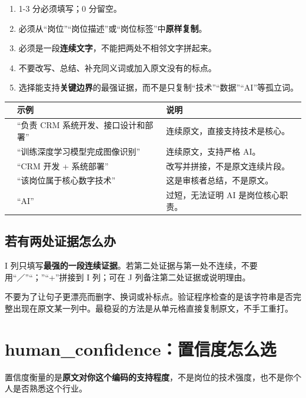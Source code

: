 \documentclass[11pt,a4paper,fontset=none]{ctexart}
\newcommand{\yes}{\textcolor{green}{\ding{51}}}
\newcommand{\no}{\textcolor{red!70!black}{\ding{55}}}
\begin{document}
\begin{enumerate}
  \item 1-3 分必须填写；0 分留空。
  \item 必须从“岗位”“岗位描述”或“岗位标签”中\textbf{原样复制}。
  \item 必须是一段\textbf{连续文字}，不能把两处不相邻文字拼起来。
  \item 不要改写、总结、补充同义词或加入原文没有的标点。
  \item 选择能支持\textbf{关键边界}的最强证据，而不是只复制“技术”“数据”“AI”等孤立词。
\end{enumerate}

\begin{center}
\noindent\begin{tabularx}{\textwidth}{C{1.1cm}Y Y}
\toprule
 & 示例 & 说明\\
\midrule
\yes & “负责 CRM 系统开发、接口设计和部署” & 连续原文，直接支持技术是核心。\\
\yes & “训练深度学习模型完成图像识别” & 连续原文，支持严格 AI。\\
\no & “CRM 开发 + 系统部署” & 改写并拼接，不是原文连续片段。\\
\no & “该岗位属于核心数字技术” & 这是审核者总结，不是原文。\\
\no & “AI” & 过短，无法证明 AI 是岗位核心职责。\\
\bottomrule
\end{tabularx}
\end{center}

\subsection{若有两处证据怎么办}

I 列只填写\textbf{最强的一段连续证据}。若第二处证据与第一处不连续，不要用“／”“；”“+”拼接到 I 列；可在 J 列备注第二处证据或说明理由。

\begin{warningbox}[复制时最容易犯的错误]
不要为了让句子更漂亮而删字、换词或补标点。验证程序检查的是该字符串是否完整出现在原文某一列中。最稳妥的方法是从单元格直接复制原文，不手工重打。
\end{warningbox}

\section{human\_confidence：置信度怎么选}

置信度衡量的是\textbf{原文对你这个编码的支持程度}，不是岗位的技术强度，也不是你个人是否熟悉这个行业。
\end{document}
